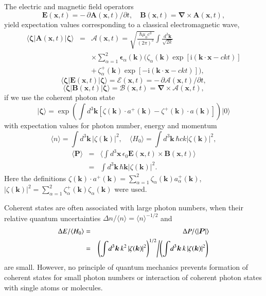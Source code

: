 \documentclass[final,3p,12pt]{elsarticle3}
\begin{document}
The electric and magnetic field operators
\[
\bm{E}(\bm{x},t)=-\,\partial\bm{A}(\bm{x},t)/\partial t,\quad
\bm{B}(\bm{x},t)=\bm{\nabla}\times\bm{A}(\bm{x},t),
\]
yield expectation values corresponding to a classical electromagnetic wave,
\begin{eqnarray}\nonumber
\bm{\langle}\bm{\zeta}\bm{|}\bm{A}(\bm{x},t)
\bm{|}\bm{\zeta}\bm{\rangle}
&=&\bm{\mathcal{A}}(\bm{x},t)
=\sqrt{\frac{\hbar\mu_0 c^3}{(2\pi)^3}}
\int\frac{d^3\bm{k}}{\sqrt{2k}}
\\ \nonumber
&&\times
\sum_{\alpha=1}^2
\bm{\epsilon}_\alpha(\bm{k})
\Big(\zeta_\alpha(\bm{k})\exp[\mathrm{i}(\bm{k}\cdot\bm{x}-ckt)]
\\ \label{eq:cohA}
&&
+\,\zeta_{\alpha}^+(\bm{k})\exp[-\mathrm{i}(\bm{k}\cdot\bm{x}-ckt)]
\Big),
\end{eqnarray}
\[
\bm{\langle}\bm{\zeta}\bm{|}\bm{E}(\bm{x},t)
\bm{|}\bm{\zeta}\bm{\rangle}
=\bm{\mathcal{E}}(\bm{x},t)
=-\,\partial\bm{\mathcal{A}}(\bm{x},t)/\partial t,
\]
\[
\bm{\langle}\bm{\zeta}\bm{|}\bm{B}(\bm{x},t)
\bm{|}\bm{\zeta}\bm{\rangle}
=\bm{\mathcal{B}}(\bm{x},t)
=\bm{\nabla}\times\bm{\mathcal{A}}(\bm{x},t),
\]
if we use the coherent photon state \cite{glauber}
\[
\bm{|}\bm{\zeta}\bm{\rangle}=\exp\!\left(\int\!d^3\bm{k}
\left[\zeta(\bm{k})\cdot a^+(\bm{k})
-\zeta^+(\bm{k})\cdot a(\bm{k})\right]\right)\!\bm{|}0\bm{\rangle}
\]
with expectation values for photon number, energy and momentum
\[
\langle n\rangle=\int\!d^3\bm{k}\,\left|\zeta(\bm{k})\right|^2,
\quad
\langle H_0\rangle=\int\!d^3\bm{k}\,\hbar ck
\left|\zeta(\bm{k})\right|^2,
\]
\begin{eqnarray*}
\langle\bm{P}\rangle&=&
\langle\int\!d^3\bm{x}\,\epsilon_0\bm{E}(\bm{x},t)
\times\bm{B}(\bm{x},t)\rangle
\\
&=&\int\!d^3\bm{k}\,\hbar\bm{k}
\left|\zeta(\bm{k})\right|^2.
\end{eqnarray*}
Here the definitions $\zeta(\bm{k})\cdot a^+(\bm{k})
=\sum_{\alpha=1}^2\zeta_\alpha(\bm{k})a^+_\alpha(\bm{k})$,
$\left|\zeta(\bm{k})\right|^2
=\sum_{\alpha=1}^2\zeta^+_\alpha(\bm{k})\zeta_\alpha(\bm{k})$
were used.

Coherent states are often associated with large photon numbers,
when their relative quantum uncertainties  
$\Delta n/\langle n\rangle=\langle n\rangle^{-1/2}$ and
\begin{eqnarray*}
\Delta E/\langle H_0\rangle&=&\Delta P/\langle|\bm{P}|\rangle
\\
&=&\left(\int\!d^3\bm{k}\,k^2
\left|\zeta(\bm{k})\right|^2\right)^{1/2}\!\left/
\left(\int\!d^3\bm{k}\,k
\left|\zeta(\bm{k})\right|^2\right)\right.
\end{eqnarray*}
are small.
However, no principle of quantum mechanics prevents formation of coherent
states for small photon numbers or interaction of coherent photon
states with single atoms or molecules.
\end{document}
